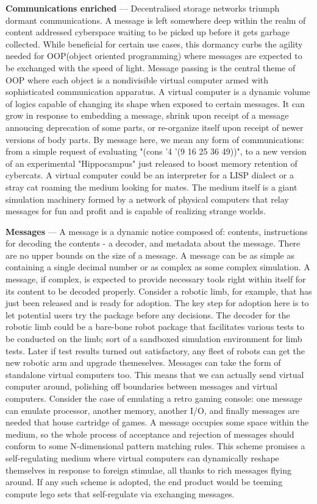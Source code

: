 \documentclass[a4paper, 10pt]{article}
\begin{document}
\textbf{Communications enriched} --- Decentralised storage networks triumph dormant communications. A message is left somewhere deep within the realm of content addressed cyberspace waiting to be picked up before it gets garbage collected. While beneficial for certain use cases, this dormancy curbs the agility needed for OOP(object oriented programming) where messages are expected to be exchanged with the speed of light. Message passing is the central theme of OOP where each object is a nondivisible virtual computer armed with sophisticated communication apparatus. A virtual computer is a dynamic volume of logics capable of changing its shape when exposed to certain messages. It can grow in response to embedding a message, shrink upon receipt of a message annoucing deprecation of some parts, or re-organize itself upon receipt of newer versions of body parts. By message here, we mean any form of communications: from a simple request of evaluating "(cons '4 '(9 16 25 36 49))", to a new version of an experimental "Hippocampus" just released to boost memory retention of cybercats. A virtual computer could be an interpreter for a LISP dialect or a stray cat roaming the medium looking for mates. The medium itself is a giant simulation machinery formed by a network of physical computers that relay messages for fun and profit and is capable of realizing strange worlds.
\par
\textbf{Messages} --- A message is a dynamic notice composed of: contents, instructions for decoding the contents - a decoder, and metadata about the message. There are no upper bounds on the size of a message. A message can be as simple as containing a single decimal number or as complex as some complex simulation. A message, if complex, is expected to provide necessary tools right within itself for its content to be decoded properly. Consider a robotic limb, for example, that has just been released and is ready for adoption. The key step for adoption here is to let potential users try the package before any decisions. The decoder for the robotic limb could be a bare-bone robot package that facilitates various tests to be conducted on the limb; sort of a sandboxed simulation environment for limb tests. Later if test results turned out satisfactory, any fleet of robots can get the new robotic arm and upgrade themeselves. Messages can take the form of standalone virtual computers too. This means that we can actually send virtual computer around, polishing off boundaries between messages and virtual computers. Consider the case of emulating a retro gaming console: one message can emulate processor, another memory, another I/O, and finally messages are needed that house cartridge of games. A message occupies some space within the medium, so the whole process of acceptance and rejection of messages should conform to some N-dimensional pattern matching rules. This scheme promises a self-regulating medium where virtual computers can dynamically reshape themselves in response to foreign stimulae, all thanks to rich messages flying around. If any such scheme is adopted, the end product would be teeming compute lego sets that self-regulate via exchanging messages. 
\end{document}
